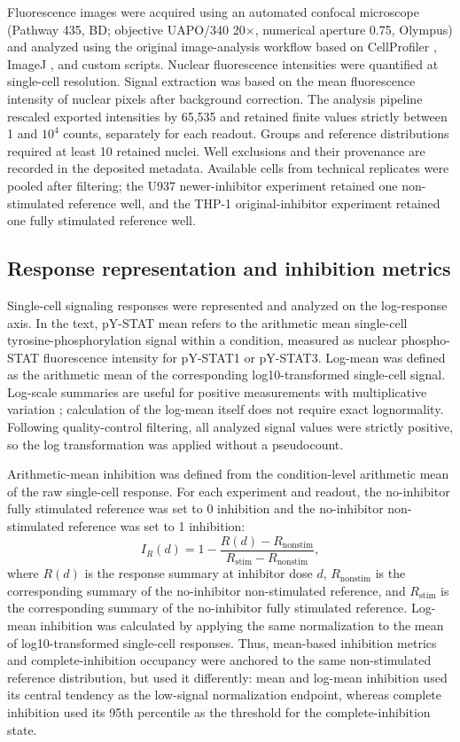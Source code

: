 \documentclass[11pt]{article}
\newcommand{\pstatone}{pY-STAT1}
\newcommand{\pstatthree}{pY-STAT3}
\begin{document}
Fluorescence images were acquired using an automated confocal microscope (Pathway 435, BD; objective UAPO/340 20$\times$, numerical aperture 0.75, Olympus) and analyzed using the original image-analysis workflow based on CellProfiler \citep{carpenter2006cellprofiler}, ImageJ \citep{schneider2012nih}, and custom scripts. Nuclear fluorescence intensities were quantified at single-cell resolution. Signal extraction was based on the mean fluorescence intensity of nuclear pixels after background correction. The analysis pipeline rescaled exported intensities by 65,535 and retained finite values strictly between 1 and $10^4$ counts, separately for each readout. Groups and reference distributions required at least 10 retained nuclei. Well exclusions and their provenance are recorded in the deposited metadata. Available cells from technical replicates were pooled after filtering; the U937 newer-inhibitor experiment retained one non-stimulated reference well, and the THP-1 original-inhibitor experiment retained one fully stimulated reference well.

\subsection*{Response representation and inhibition metrics}

Single-cell signaling responses were represented and analyzed on the log-response axis. In the text, pY-STAT mean refers to the arithmetic mean single-cell tyrosine-phosphorylation signal within a condition, measured as nuclear phospho-STAT fluorescence intensity for \pstatone{} or \pstatthree{}. Log-mean was defined as the arithmetic mean of the corresponding log10-transformed single-cell signal. Log-scale summaries are useful for positive measurements with multiplicative variation \citep{motulsky2025analyzing}; calculation of the log-mean itself does not require exact lognormality. Following quality-control filtering, all analyzed signal values were strictly positive, so the log transformation was applied without a pseudocount.

Arithmetic-mean inhibition was defined from the condition-level arithmetic mean of the raw single-cell response. For each experiment and readout, the no-inhibitor fully stimulated reference was set to 0 inhibition and the no-inhibitor non-stimulated reference was set to 1 inhibition:
\[
I_R(d) = 1 - \frac{R(d) - R_{\mathrm{nonstim}}}{R_{\mathrm{stim}} - R_{\mathrm{nonstim}}},
\]
where $R(d)$ is the response summary at inhibitor dose $d$, $R_{\mathrm{nonstim}}$ is the corresponding summary of the no-inhibitor non-stimulated reference, and $R_{\mathrm{stim}}$ is the corresponding summary of the no-inhibitor fully stimulated reference. Log-mean inhibition was calculated by applying the same normalization to the mean of log10-transformed single-cell responses. Thus, mean-based inhibition metrics and complete-inhibition occupancy were anchored to the same non-stimulated reference distribution, but used it differently: mean and log-mean inhibition used its central tendency as the low-signal normalization endpoint, whereas complete inhibition used its 95th percentile as the threshold for the complete-inhibition state.
\end{document}
